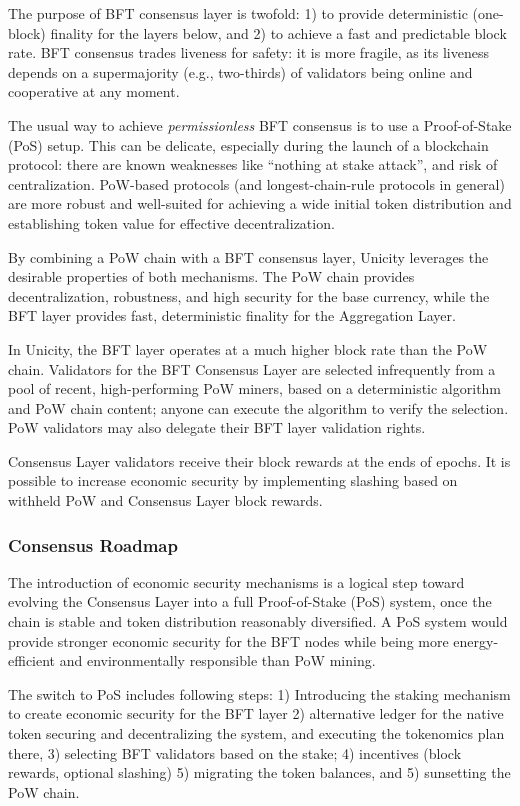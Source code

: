 \documentclass[twocolumn]{article}
\begin{document}
The purpose of BFT consensus layer is twofold: 1) to provide deterministic (one-block) finality for the layers below, and 2) to achieve a fast and predictable block rate. BFT consensus trades liveness for safety: it is more fragile, as its liveness depends on a supermajority (e.g., two-thirds) of validators being online and cooperative at any moment.

The usual way to achieve \emph{permissionless} BFT consensus is to use a Proof-of-Stake (PoS) setup. This can be delicate, especially during the launch of a blockchain protocol: there are known weaknesses like ``nothing at stake attack'', and risk of centralization. PoW-based protocols (and longest-chain-rule protocols in general) are more robust and well-suited for achieving a wide initial token distribution and establishing token value for effective decentralization.

By combining a PoW chain with a BFT consensus layer, Unicity leverages the desirable properties of both mechanisms. The PoW chain provides decentralization, robustness, and high security for the base currency, while the BFT layer provides fast, deterministic finality for the Aggregation Layer.

In Unicity, the BFT layer operates at a much higher block rate than the PoW chain. Validators for the BFT Consensus Layer are selected infrequently from a pool of recent, high-performing PoW miners, based on a deterministic algorithm and PoW chain content; anyone can execute the algorithm to verify the selection. PoW validators may also delegate their BFT layer validation rights.

Consensus Layer validators receive their block rewards at the ends of epochs. It is possible to increase economic security by implementing slashing based on withheld PoW and Consensus Layer block rewards.

\subsubsection{Consensus Roadmap}

The introduction of economic security mechanisms is a logical step toward evolving the Consensus Layer into a full Proof-of-Stake (PoS) system, once the chain is stable and token distribution reasonably diversified. A PoS system would provide stronger economic security for the BFT nodes while being more energy-efficient and environmentally responsible than PoW mining.

The switch to PoS includes following steps: 1) Introducing the staking mechanism to create economic security for the BFT layer 2) alternative ledger for the native token securing and decentralizing the system, and executing the tokenomics plan there, 3) selecting BFT validators based on the stake; 4) incentives (block rewards, optional slashing) 5) migrating the token balances, and 5) sunsetting the PoW chain.
\end{document}
